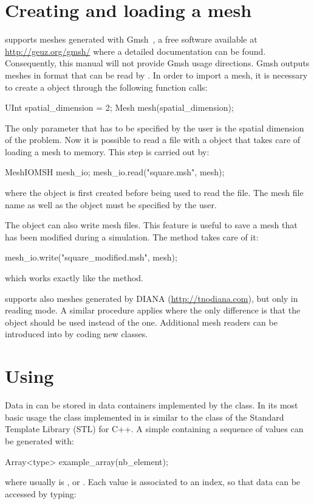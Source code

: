 \section{Creating and loading a mesh\label{sect:common:mesh}}

\akantu supports meshes generated with Gmsh~\cite{gmsh}, a free
software available at \url{http://geuz.org/gmsh/} where a detailed
documentation can be found. Consequently, this manual will not provide
Gmsh usage directions. Gmsh outputs meshes in  format that can be read
by \akantu. In order to import a mesh, it is necessary to create
a  object through the following function calls:
\begin{cpp}
  UInt spatial_dimension = 2;
  Mesh mesh(spatial_dimension);
\end{cpp}
The only parameter that has to be specified by the user is the spatial
dimension of the problem. Now it is possible to read a  file with
a  object that takes care of loading a mesh to memory.
This step is carried out by:
\begin{cpp}
  MeshIOMSH mesh_io;
  mesh_io.read("square.msh", mesh);
\end{cpp}
where the  object is first created before being
used to read the  file. The mesh file name as well as the 
object must be specified by the user.

The  object can also write mesh files. This feature
is useful to save a mesh that has been modified during a
simulation. The  method takes care of it:
\begin{cpp}
  mesh_io.write("square_modified.msh", mesh);
\end{cpp}
which works exactly like the  method.

\akantu supports also meshes generated by
DIANA (\url{http://tnodiana.com}), but only in reading mode. A similar
procedure applies where the only
difference is that the  object should be used
instead of the  one. Additional mesh readers can be
introduced into \akantu by coding new  classes.

\section{Using }

Data in \akantu can be stored in data containers implemented by
the  class. In its most basic usage the  class
implemented in \akantu is similar to the  class of
the Standard Template Library (STL) for C++. A simple 
containing a sequence of  values can be generated with:
\begin{cpp}
  Array<type> example_array(nb_element);
\end{cpp}
where  usually is ,  or
. Each value is associated to an index, so that data can be
accessed by typing:

